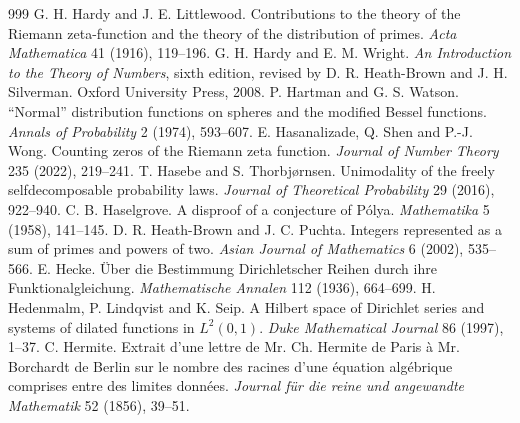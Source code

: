 \begin{thebibliography}{999}
 G. H. Hardy and J. E. Littlewood. Contributions to the theory of the Riemann zeta-function and the theory of the distribution of primes. \emph{Acta Mathematica} 41 (1916), 119--196.
 G. H. Hardy and E. M. Wright. \emph{An Introduction to the Theory of Numbers}, sixth edition, revised by D. R. Heath-Brown and J. H. Silverman. Oxford University Press, 2008.
 P. Hartman and G. S. Watson. ``Normal'' distribution functions on spheres and the modified Bessel functions. \emph{Annals of Probability} 2 (1974), 593--607.
 E. Hasanalizade, Q. Shen and P.-J. Wong. Counting zeros of the Riemann zeta function. \emph{Journal of Number Theory} 235 (2022), 219--241.
 T. Hasebe and S. Thorbj{\o}rnsen. Unimodality of the freely selfdecomposable probability laws. \emph{Journal of Theoretical Probability} 29 (2016), 922--940.
 C. B. Haselgrove. A disproof of a conjecture of P\'olya. \emph{Mathematika} 5 (1958), 141--145.
 D. R. Heath-Brown and J. C. Puchta. Integers represented as a sum of primes and powers of two. \emph{Asian Journal of Mathematics} 6 (2002), 535--566.
 E. Hecke. \"Uber die Bestimmung Dirichletscher Reihen durch ihre Funktionalgleichung. \emph{Mathematische Annalen} 112 (1936), 664--699.
 H. Hedenmalm, P. Lindqvist and K. Seip. A Hilbert space of Dirichlet series and systems of dilated functions in $L^2(0,1)$. \emph{Duke Mathematical Journal} 86 (1997), 1--37.
 C. Hermite. Extrait d'une lettre de Mr. Ch. Hermite de Paris \`a Mr. Borchardt de Berlin sur le nombre des racines d'une \'equation alg\'ebrique comprises entre des limites donn\'ees. \emph{Journal f\"ur die reine und angewandte Mathematik} 52 (1856), 39--51.

\end{thebibliography}
